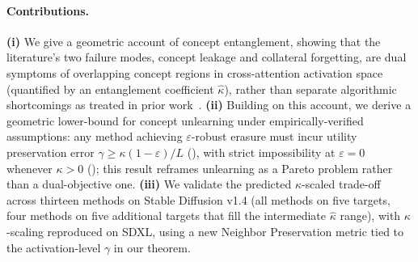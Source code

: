 \paragraph{Contributions.} 
\textbf{(i)} We give a geometric account of concept entanglement, showing that the literature's two failure modes, 
concept leakage and collateral forgetting, are dual symptoms of overlapping concept regions in cross-attention activation space (quantified by an entanglement coefficient $\hat\kappa$), rather than separate algorithmic shortcomings as treated in prior work~\citep{gandikota2023erasing,zhang2024defensive,srivatsan2025stereo,cywinski2025saeuron}. \textbf{(ii)} Building on this account,
we derive a geometric lower-bound for concept unlearning under empirically-verified assumptions: any method achieving $\varepsilon$-robust erasure must incur utility preservation error $\gamma \geq \kappa(1-\varepsilon)/L$ (), with strict impossibility at $\varepsilon = 0$ whenever $\kappa > 0$ (); this result reframes unlearning as a Pareto problem rather than a dual-objective one. \textbf{(iii)} We validate the predicted $\kappa$-scaled trade-off across thirteen methods on Stable Diffusion v1.4 (all methods on five targets, four methods on five additional targets that fill the intermediate $\hat\kappa$ range), with $\kappa$-scaling reproduced on SDXL, using a new Neighbor Preservation metric tied to the activation-level $\gamma$ in our theorem.



